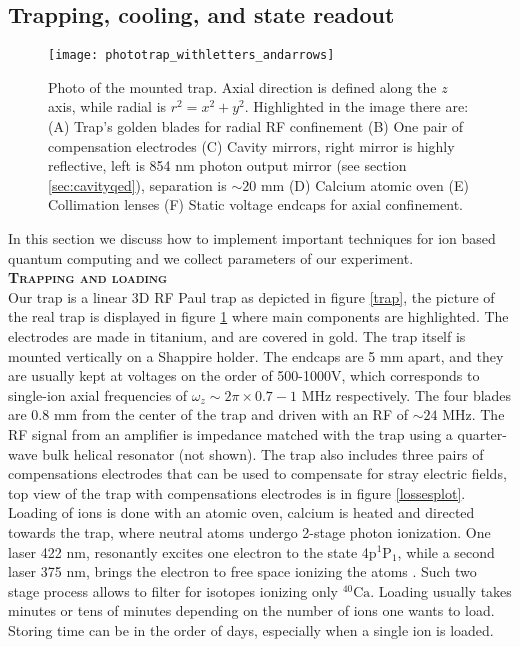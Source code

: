 \subsection{Trapping, cooling, and state readout}
\label{sec:expparameters}
\begin{figure}
\centering
\texttt{[image: phototrap\_withletters\_andarrows]}
\caption{Photo of the mounted trap. Axial direction is defined along the $z$ axis, while radial is $r^2 = x^2 + y^2$. Highlighted in the image there are: (A) Trap's golden blades for radial RF confinement (B) One pair of compensation electrodes (C) Cavity mirrors, right mirror is highly reflective, left is 854 nm photon output mirror (see section \ref{sec:cavityqed}), separation is $\sim 20$ mm (D) Calcium atomic oven (E) Collimation lenses (F) Static voltage endcaps for axial confinement.}
\label{trapphoto}
\end{figure}
In this section we discuss how to implement important techniques for ion based quantum computing and we collect parameters of our experiment.\vspace{.5em}\\
\textbf{\textsc{Trapping and loading}}\\
Our trap is a linear 3D RF Paul trap as depicted in figure \ref{trap}, the picture of the real trap is displayed in figure \ref{trapphoto} where main components are highlighted. The electrodes are made in titanium, and are covered in gold. The trap itself is mounted vertically on a Shappire holder. The endcaps are 5 mm apart, and they are usually kept at voltages on the order of 500-1000V, which corresponds to single-ion axial frequencies of $\omega_z \sim 2\pi \times 0.7-1$ MHz respectively. The four blades are 0.8 mm from the center of the trap and driven with an RF of $\sim 24$ MHz. The RF signal from an amplifier is impedance matched with the trap using a quarter-wave bulk helical resonator (not shown). The trap also includes three pairs of compensations electrodes that can be used to compensate for stray electric fields, top view of the trap with compensations electrodes is in figure \ref{lossesplot}.\\
Loading of ions is done with an atomic oven, calcium is heated and directed towards the trap, where neutral atoms undergo 2-stage photon ionization. One laser 422 nm, resonantly excites one electron to the state 4p$^1\text{P}_1$, while a second laser 375 nm, brings the electron to free space ionizing the atoms \cite{Gulde2001}. Such two stage process allows to filter for isotopes ionizing only $^{40}\text{Ca}$. Loading usually takes minutes or tens of minutes depending on the number of ions one wants to load. Storing time can be in the order of days, especially when a single ion is loaded.\vspace{.5em}\\
